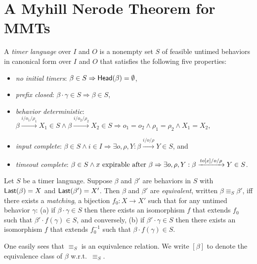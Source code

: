 \section{A Myhill Nerode Theorem for MMTs}
\label{sec:nerode}

\begin{definition}
\label{def:timer language}
A \emph{timer language} over $I$ and $O$ is a nonempty set 
$S$ of feasible untimed behaviors in canonical form over $I$ and $O$ that satisfies the following five properties:
\begin{itemize}
\item
\emph{no initial timers}: $\beta \in S \Rightarrow \mathsf{Head}({\beta}) = \emptyset$,
\item
\emph{prefix closed}: $\beta \cdot \gamma \in S \Rightarrow \beta \in S$,
\item
\emph{behavior deterministic}:
$\beta \xrightarrow{i/o_1/\rho_1} X_1 \in S \wedge \beta \xrightarrow{i/o_2/\rho_2} X_2 \in S \Rightarrow o_1 = o_2 \wedge \rho_1 = \rho_2 \wedge X_1 = X_2$,
\item
\emph{input complete}:
$\beta \in S \wedge i \in I \Rightarrow \exists o, \rho, Y : \beta \xrightarrow{i/o/\rho} Y \in S$,
and
\item
\emph{timeout complete}:
$\beta \in S \wedge x \mbox{ expirable after } \beta \Rightarrow
\exists o, \rho, Y: \beta \xrightarrow{\mathit{to}[x]/o/\rho} Y \in S$.
\end{itemize}
\end{definition}

\begin{definition}
\label{def:nerode}
Let $S$ be a timer language.
Suppose $\beta$ and $\beta'$ are behaviors in $S$ with $\mathsf{Last}({\beta}) = X$ and $\mathsf{Last}({\beta'}) = X'$.
Then $\beta$ and $\beta'$ are \emph{equivalent}, written $\beta \equiv_S \beta'$, iff there exists a \emph{matching}, a bijection
$f_0 : X \to X'$ such that for any untimed behavior $\gamma$:
(a) if $\beta \cdot \gamma \in S$ then there exists an isomorphism $f$ that extends $f_0$ such that $\beta' \cdot f(\gamma) \in S$, and conversely,
(b) if $\beta' \cdot \gamma \in S$ then there exists an isomorphism $f$ that extends $f_0^{-1}$ such that $\beta \cdot f(\gamma) \in S$.
\end{definition}

One easily sees that $\equiv_S$ is an equivalence relation.
We write $[\beta]$ to denote the equivalence class of $\beta$ w.r.t.\  $\equiv_S$.

